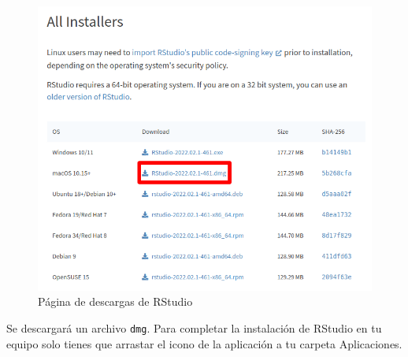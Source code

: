 \documentclass[
  title=normal,
  notoc,
  bib=normal]{mnye}
\newcommand{\passthrough}[1]{#1}
\begin{document}
\begin{figure}

{\centering \includegraphics[width=0.9\linewidth]{images/rstudio-mac} 

}

\caption{Página de descargas de RStudio}\label{fig:unnamed-chunk-16}
\end{figure}

Se descargará un archivo \passthrough{\lstinline!dmg!}. Para completar la instalación de RStudio en tu equipo solo tienes que arrastar el icono de la aplicación a tu carpeta Aplicaciones.

\printbibliography

%
\end{document}
